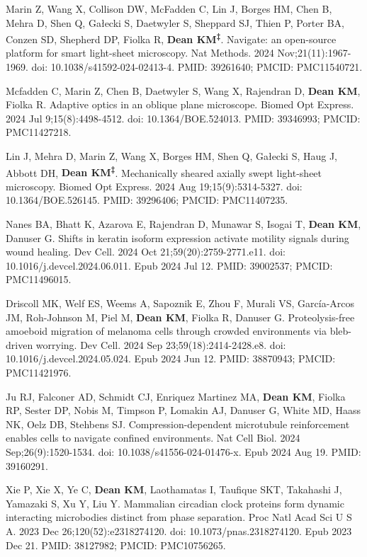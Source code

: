 \begin{etaremune}
\item Marin Z, Wang X, Collison DW, McFadden C, Lin J, Borges HM, Chen B, Mehra D, Shen Q, Ga{\l}ecki S, Daetwyler S, Sheppard SJ, Thien P, Porter BA, Conzen SD, Shepherd DP, Fiolka R, \textbf{Dean KM\textsuperscript{‡}}. Navigate: an open-source platform for smart light-sheet microscopy. Nat Methods. 2024 Nov;21(11):1967-1969. doi: 10.1038/s41592-024-02413-4. PMID: 39261640; PMCID: PMC11540721.

\item Mcfadden C, Marin Z, Chen B, Daetwyler S, Wang X, Rajendran D, \textbf{Dean KM}, Fiolka R. Adaptive optics in an oblique plane microscope. Biomed Opt Express. 2024 Jul 9;15(8):4498-4512. doi: 10.1364/BOE.524013. PMID: 39346993; PMCID: PMC11427218.

\item Lin J, Mehra D, Marin Z, Wang X, Borges HM, Shen Q, Ga{\l}ecki S, Haug J, Abbott DH, \textbf{Dean KM\textsuperscript{‡}}. Mechanically sheared axially swept light-sheet microscopy. Biomed Opt Express. 2024 Aug 19;15(9):5314-5327. doi: 10.1364/BOE.526145. PMID: 39296406; PMCID: PMC11407235.

\item Nanes BA, Bhatt K, Azarova E, Rajendran D, Munawar S, Isogai T, \textbf{Dean KM}, Danuser G. Shifts in keratin isoform expression activate motility signals during wound healing. Dev Cell. 2024 Oct 21;59(20):2759-2771.e11. doi: 10.1016/j.devcel.2024.06.011. Epub 2024 Jul 12. PMID: 39002537; PMCID: PMC11496015.

\item Driscoll MK, Welf ES, Weems A, Sapoznik E, Zhou F, Murali VS, Garc\'{i}a-Arcos JM, Roh-Johnson M, Piel M, \textbf{Dean KM}, Fiolka R, Danuser G. Proteolysis-free amoeboid migration of melanoma cells through crowded environments via bleb-driven worrying. Dev Cell. 2024 Sep 23;59(18):2414-2428.e8. doi: 10.1016/j.devcel.2024.05.024. Epub 2024 Jun 12. PMID: 38870943; PMCID: PMC11421976.

\item Ju RJ, Falconer AD, Schmidt CJ, Enriquez Martinez MA, \textbf{Dean KM}, Fiolka RP, Sester DP, Nobis M, Timpson P, Lomakin AJ, Danuser G, White MD, Haass NK, Oelz DB, Stehbens SJ. Compression-dependent microtubule reinforcement enables cells to navigate confined environments. Nat Cell Biol. 2024 Sep;26(9):1520-1534. doi: 10.1038/s41556-024-01476-x. Epub 2024 Aug 19. PMID: 39160291.

\item Xie P, Xie X, Ye C, \textbf{Dean KM}, Laothamatas I, Taufique SKT, Takahashi J, Yamazaki S, Xu Y, Liu Y. Mammalian circadian clock proteins form dynamic interacting microbodies distinct from phase separation. Proc Natl Acad Sci U S A. 2023 Dec 26;120(52):e2318274120. doi: 10.1073/pnas.2318274120. Epub 2023 Dec 21. PMID: 38127982; PMCID: PMC10756265.


\end{etaremune}
